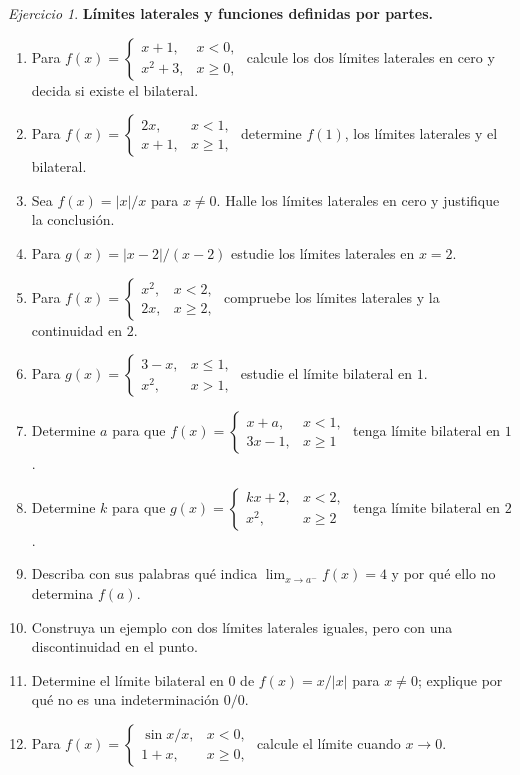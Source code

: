 \documentclass[12pt]{article}
\theoremstyle{remark}
\newtheorem{Ejer}{Ejercicio}
\begin{document}
\begin{Ejer}\textbf{Límites laterales y funciones definidas por partes.}
\begin{enumerate}[resume=banco]
\item Para $f(x)=\begin{cases}x+1,&x<0,\\x^2+3,&x\ge0,\end{cases}$ calcule los dos límites laterales en cero y decida si existe el bilateral.
\item Para $f(x)=\begin{cases}2x,&x<1,\\x+1,&x\ge1,\end{cases}$ determine $f(1)$, los límites laterales y el bilateral.
\item Sea $f(x)=|x|/x$ para $x\ne0$. Halle los límites laterales en cero y justifique la conclusión.
\item Para $g(x)=|x-2|/(x-2)$ estudie los límites laterales en $x=2$.
\item Para $f(x)=\begin{cases}x^2,&x<2,\\2x,&x\ge2,\end{cases}$ compruebe los límites laterales y la continuidad en $2$.
\item Para $g(x)=\begin{cases}3-x,&x\le1,\\x^2,&x>1,\end{cases}$ estudie el límite bilateral en $1$.
\item Determine $a$ para que $f(x)=\begin{cases}x+a,&x<1,\\3x-1,&x\ge1\end{cases}$ tenga límite bilateral en $1$.
\item Determine $k$ para que $g(x)=\begin{cases}kx+2,&x<2,\\x^2,&x\ge2\end{cases}$ tenga límite bilateral en $2$.
\item Describa con sus palabras qué indica $\lim_{x\to a^-}f(x)=4$ y por qué ello no determina $f(a)$.
\item Construya un ejemplo con dos límites laterales iguales, pero con una discontinuidad en el punto.
\item Determine el límite bilateral en $0$ de $f(x)=x/|x|$ para $x\ne0$; explique por qué no es una indeterminación $0/0$.
\item Para $f(x)=\begin{cases}\sin x/x,&x<0,\\1+x,&x\ge0,\end{cases}$ calcule el límite cuando $x\to0$.
\end{enumerate}
\end{Ejer}
\end{document}
